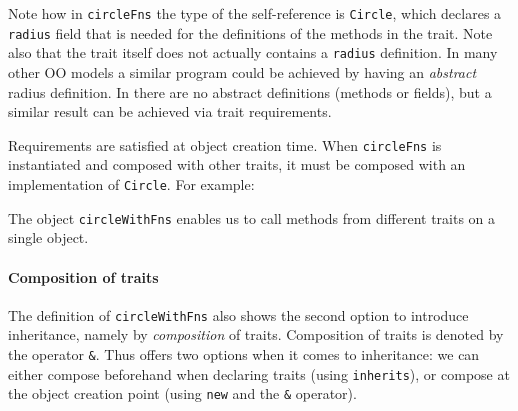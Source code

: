 \noindent Note how in \lstinline$circleFns$ the type of the self-reference is
\lstinline$Circle$, which declares a \lstinline{radius} field that is needed for
the definitions of the methods in the trait. Note also that the trait itself
does not actually contains a \lstinline{radius} definition. In many other OO
models a similar program could be achieved by having an \emph{abstract} radius
definition. In \name there are no abstract definitions (methods or fields), but
a similar result can be achieved via trait requirements.

Requirements are satisfied at object creation time. When \lstinline$circleFns$
is instantiated and composed with other traits, it must be composed with an
implementation of \lstinline$Circle$. For example:

The object \lstinline{circleWithFns} enables us to call
methods from different traits on a single object.

\paragraph{Composition of traits}
The definition of \lstinline{circleWithFns} also shows the second option to
introduce inheritance, namely by \textit{composition} of traits. Composition of
traits is denoted by the operator \lstinline{&}. Thus \name offers two options
when it comes to inheritance: we can either compose beforehand when declaring
traits (using \lstinline{inherits}), or compose at the object creation point
(using \lstinline{new} and the \lstinline{&} operator).

\begin{comment}
\paragraph{Mutually dependent traits} When two traits are composed, any two
methods in those two traits can refer to each other via the self-reference. We
say these two traits are \textit{mutually dependent}. The next example, though a
bit contrived, illustrates this point.

\noindent By utilizing trait requirements, the \lstinline{isEven} and
\lstinline{isOdd} methods can refer to each other in two different traits.
\end{comment}


